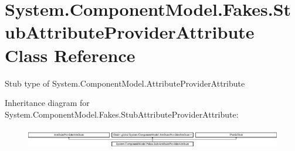 \hypertarget{class_system_1_1_component_model_1_1_fakes_1_1_stub_attribute_provider_attribute}{\section{System.\-Component\-Model.\-Fakes.\-Stub\-Attribute\-Provider\-Attribute Class Reference}
\label{class_system_1_1_component_model_1_1_fakes_1_1_stub_attribute_provider_attribute}
}


Stub type of System.\-Component\-Model.\-Attribute\-Provider\-Attribute 


Inheritance diagram for System.\-Component\-Model.\-Fakes.\-Stub\-Attribute\-Provider\-Attribute\-:\begin{figure}[H]
\begin{center}
\leavevmode
\includegraphics[height=0.935673cm]{class_system_1_1_component_model_1_1_fakes_1_1_stub_attribute_provider_attribute}
\end{center}
\end{figure}
